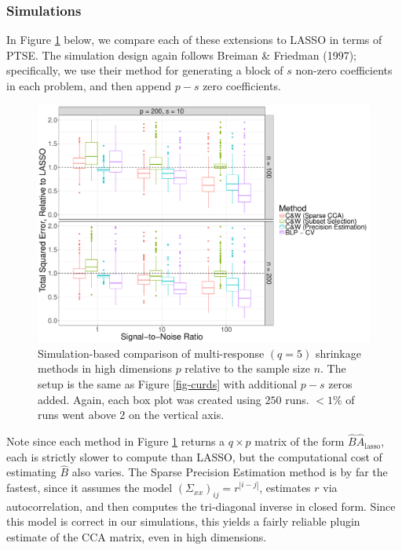 \documentclass[main]{subfiles}
\begin{document}
\subsubsection{Simulations}

In Figure \ref{fig-sparse-curds} below, we compare each of these extensions to LASSO in terms of PTSE. The simulation design again follows Breiman \& Friedman (1997); specifically, we use their method for generating a block of $s$ non-zero coefficients in each problem, and then append $p-s$ zero coefficients.

\begin{figure}[h!]
\centering
\includegraphics[width = 16cm]{../curds_n_whey/TSE_sparse_curds.pdf}
\caption{Simulation-based comparison of multi-response $(q=5)$ shrinkage methods in high dimensions $p$ relative to the sample size $n$. The setup is the same as Figure \ref{fig-curds} with additional $p-s$ zeros added. Again, each box plot was created using $250$ runs. $<1\%$ of runs went above $2$ on the vertical axis.}
\label{fig-sparse-curds}
\end{figure}

\newpage

Note since each method in Figure \ref{fig-sparse-curds} returns a $q\times p$ matrix of the form $\widehat{B}\widehat{A}_{\text{lasso}}$, each is strictly slower to compute than LASSO, but the computational cost of estimating $\widehat{B}$ also varies. The Sparse Precision Estimation method is by far the fastest, since it assumes the model $(\Sigma_{xx})_{ij} = r^{|i-j|}$, estimates $r$ via autocorrelation, and then computes the tri-diagonal inverse in closed form. Since this model is correct in our simulations, this yields a fairly reliable plugin estimate of the CCA matrix, even in high dimensions.
\end{document}
